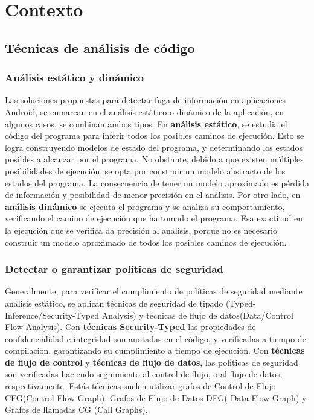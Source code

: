 \section{Contexto}
\subsection{Técnicas de análisis de código}
\subsubsection{Análisis estático y dinámico}
Las soluciones propuestas para detectar fuga de información en aplicaciones
Android, se enmarcan en el análisis estático o dinámico de la aplicación, en
algunos casos, se combinan ambos tipos.\newline 
En \textbf{análisis estático}\cite{Static-dynamic}, se estudia el código del
programa para inferir todos los posibles caminos de ejecución. Esto se logra
construyendo modelos de estado del programa, y determinando los estados posibles
a alcanzar por el programa.
No obstante, debido a que existen múltiples posibilidades de ejecución, se opta
por construir un modelo abstracto de los estados del programa. La consecuencia
de tener un modelo aproximado es pérdida de información y posibilidad de menor
precisión en el análisis.\newline 
Por otro lado, en \textbf{análisis dinámico} se ejecuta el programa y se analiza
su comportamiento, verificando el camino de ejecución que ha tomado el programa.
Esa exactitud en la ejecución que se verifica da precisión al análisis, porque
no es necesario construir un modelo aproximado de todos los posibles caminos de
ejecución.

\subsubsection{Detectar o garantizar políticas de seguridad} 
Generalmente, para verificar el cumplimiento de políticas de seguridad mediante
análisis estático, se aplican técnicas de seguridad de tipado
(Typed-Inference/Security-Typed Analysis) y técnicas de flujo de
datos(Data/Control Flow Analysis)\cite{Information-Flow-Java}.\newline 
Con \textbf{técnicas Security-Typed} las propiedades de confidencialidad e
integridad son anotadas en el código, y verificadas a tiempo de compilación,
garantizando su cumplimiento a tiempo de ejecución.\newline 
Con \textbf{técnicas de flujo de control} y \textbf{técnicas de flujo de datos},
las políticas de seguridad son verificadas haciendo seguimiento al control de
flujo, o al flujo de datos, respectivamente. Estás técnicas suelen utilizar
grafos de Control de Flujo CFG(Control Flow Graph), Grafos de Flujo de Datos
DFG( Data Flow Graph) y Grafos de llamadas CG (Call Graphs).

